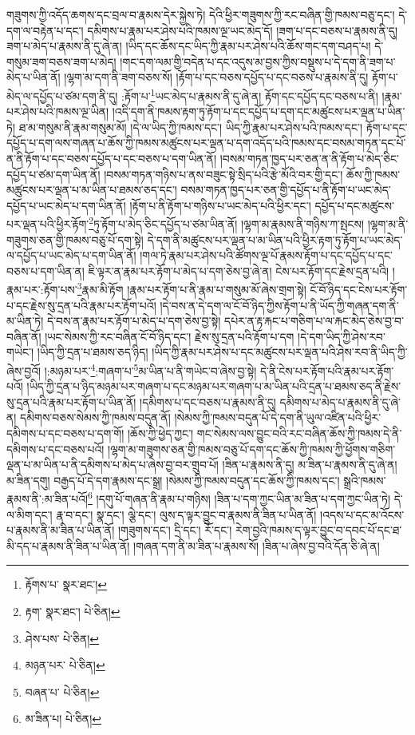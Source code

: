 གཟུགས་ཀྱི་འདོད་ཆགས་དང་བྲལ་བ་རྣམས་དེར་སྐྱེས་ཏེ། དེའི་ཕྱིར་གཟུགས་ཀྱི་རང་བཞིན་གྱི་ཁམས་བཅུ་དང་། དེ་དག་ལ་བརྟེན་པ་དང་། དམིགས་པ་རྣམ་པར་ཤེས་པའི་ཁམས་ལྔ་ཡང་མེད་དོ། །ཟག་པ་དང་བཅས་པ་རྣམས་ནི་དུ། ཟག་པ་མེད་པ་རྣམས་ནི་དུ་ཞེ་ན། །ཡིད་དང་ཆོས་དང་ཡིད་ཀྱི་རྣམ་པར་ཤེས་པའི་ཆོས་གང་དག་བཤད་པ། དེ་གསུམ་ཟག་བཅས་ཟག་པ་མེད། །གང་དག་ལམ་གྱི་བདེན་པ་དང་འདུས་མ་བྱས་ཀྱིས་བསྡུས་པ་དེ་དག་ནི་ཟག་པ་མེད་པ་ཡིན་ནོ། །ལྷག་མ་དག་ནི་ཟག་བཅས་སོ། །རྟོག་པ་དང་བཅས་དཔྱོད་པ་དང་བཅས་པ་རྣམས་ནི་དུ། རྟོག་པ་མེད་ལ་དཔྱོད་པ་ཙམ་དག་ནི་དུ། :རྟོག་པ་\footnote{རྟོགས་པ་  སྣར་ཐང་། }ཡང་མེད་པ་རྣམས་ནི་དུ་ཞེ་ན། རྟོག་དང་དཔྱོད་དང་བཅས་པ་ནི། །རྣམ་པར་ཤེས་པའི་ཁམས་ལྔ་ཡིན། །འདི་དག་ནི་ཁམས་རྟག་ཏུ་རྟོག་པ་དང་དཔྱོད་པ་དག་དང་མཚུངས་པར་ལྡན་པ་ཡིན་ཏེ། ཐ་མ་གསུམ་ནི་རྣམ་གསུམ་མོ། །དེ་ལ་ཡིད་ཀྱི་ཁམས་དང་། ཡིད་ཀྱི་རྣམ་པར་ཤེས་པའི་ཁམས་དང་། རྟོག་པ་དང་དཔྱོད་པ་དག་ལས་གཞན་པ་ཆོས་ཀྱི་ཁམས་མཚུངས་པར་ལྡན་པ་དག་འདོད་པའི་ཁམས་དང་བསམ་གཏན་དང་པོ་ན་ནི་རྟོག་པ་དང་བཅས་དཔྱོད་པ་དང་བཅས་པ་དག་ཡིན་ནོ། །བསམ་གཏན་ཁྱད་པར་ཅན་ན་ནི་རྟོག་པ་མེད་ཅིང་དཔྱོད་པ་ཙམ་དག་ཡིན་ནོ། །བསམ་གཏན་གཉིས་པ་ནས་བཟུང་སྟེ་སྲིད་པའི་རྩེ་མོའི་བར་གྱི་དང་། ཆོས་ཀྱི་ཁམས་མཚུངས་པར་ལྡན་པ་མ་ཡིན་པ་ཐམས་ཅད་དང་། བསམ་གཏན་ཁྱད་པར་ཅན་གྱི་དཔྱོད་པ་ནི་རྟོག་པ་ཡང་མེད་དཔྱོད་པ་ཡང་མེད་པ་དག་ཡིན་ནོ། །རྟོག་པ་ནི་རྟོག་པ་གཉིས་པ་ཡང་མེད་པའི་ཕྱིར་དང་། དཔྱོད་པ་དང་མཚུངས་པར་ལྡན་པའི་ཕྱིར་རྟོག་\footnote{རྟག་  སྣར་ཐང་།  པེ་ཅིན། }ཏུ་རྟོག་པ་མེད་ཅིང་དཔྱོད་པ་ཙམ་ཡིན་ནོ། །ལྷག་མ་རྣམས་ནི་གཉིས་ཀ་སྤངས། །ལྷག་མ་ནི་གཟུགས་ཅན་གྱི་ཁམས་བཅུ་པོ་དག་སྟེ། དེ་དག་ནི་མཚུངས་པར་ལྡན་པ་མ་ཡིན་པའི་ཕྱིར་རྟག་ཏུ་རྟོག་པ་ཡང་མེད་ལ་དཔྱོད་པ་ཡང་མེད་པ་དག་ཡིན་ནོ། །གལ་ཏེ་རྣམ་པར་ཤེས་པའི་ཚོགས་ལྔ་པོ་རྣམས་རྟོག་པ་དང་དཔྱོད་པ་དང་བཅས་པ་དག་ཡིན་ན། ཇི་ལྟར་ན་རྣམ་པར་རྟོག་པ་མེད་པ་དག་ཅེས་བྱ་ཞེ་ན། ངེས་པར་རྟོག་དང་རྗེས་དྲན་པའི། །རྣམ་པར་:རྟོག་པས་\footnote{ཤེས་པས་  པེ་ཅིན། }རྣམ་མི་རྟོག །རྣམ་པར་རྟོག་པ་ནི་རྣམ་པ་གསུམ་མོ་ཞེས་གྲག་སྟེ། ངོ་བོ་ཉིད་དང་ངེས་པར་རྟོག་པ་དང་རྗེས་སུ་དྲན་པའི་རྣམ་པར་རྟོག་པའོ། །དེ་བས་ན་དེ་དག་ལ་ངོ་བོ་ཉིད་ཀྱིས་རྟོག་པ་ནི་ཡོད་ཀྱི་གཞན་དག་ནི་མ་ཡིན་ཏེ། དེ་བས་ན་རྣམ་པར་རྟོག་པ་མེད་པ་དག་ཅེས་བྱ་སྟེ། དཔེར་ན་རྟ་རྐང་པ་གཅིག་པ་ལ་རྐང་མེད་ཅེས་བྱ་བ་བཞིན་ནོ། །ཡང་སེམས་ཀྱི་རང་བཞིན་ངོ་བོ་ཉིད་དང་། རྗེས་སུ་དྲན་པའི་རྟོག་པ་དག །དེ་དག་ཡིད་ཀྱི་ཤེས་རབ་གཡེང་། །ཡིད་ཀྱི་དྲན་པ་ཐམས་ཅད་ཉིད། །ཡིད་ཀྱི་རྣམ་པར་ཤེས་པ་དང་མཚུངས་པར་ལྡན་པའི་ཤེས་རབ་ནི་ཡིད་ཀྱི་ཞེས་བྱའོ། །:མཉམ་པར་\footnote{མཉན་པར་  པེ་ཅིན། }:གཞག་པ་\footnote{བཞན་པ་  པེ་ཅིན། }མ་ཡིན་པ་ནི་གཡེང་བ་ཞེས་བྱ་སྟེ། དེ་ནི་ངེས་པར་རྟོག་པའི་རྣམ་པར་རྟོག་པའོ། །ཡིད་ཀྱི་དྲན་པ་ཉིད་མཉམ་པར་གཞག་པ་དང་མཉམ་པར་གཞག་པ་མ་ཡིན་པའི་དྲན་པ་ཐམས་ཅད་ནི་རྗེས་སུ་དྲན་པའི་རྣམ་པར་རྟོག་པ་ཡིན་ནོ། །དམིགས་པ་དང་བཅས་པ་རྣམས་ནི་དུ། དམིགས་པ་མེད་པ་རྣམས་ནི་དུ་ཞེ་ན། དམིགས་བཅས་སེམས་ཀྱི་ཁམས་བདུན་ནོ། །སེམས་ཀྱི་ཁམས་བདུན་པོ་དེ་དག་ནི་ཡུལ་འཛིན་པའི་ཕྱིར་དམིགས་པ་དང་བཅས་པ་དག་གོ། །ཆོས་ཀྱི་ཕྱེད་ཀྱང་། གང་སེམས་ལས་བྱུང་བའི་རང་བཞིན་ཆོས་ཀྱི་ཁམས་དེ་ནི་དམིགས་པ་དང་བཅས་པའོ། །ལྷག་མ་གཟུགས་ཅན་གྱི་ཁམས་བཅུ་པོ་དག་དང་ཆོས་ཀྱི་ཁམས་ཀྱི་ཕྱོགས་གཅིག་ལྡན་པ་མ་ཡིན་པ་ནི་དམིགས་པ་མེད་པ་ཞེས་བྱ་བར་གྲུབ་པོ། །ཟིན་པ་རྣམས་ནི་དུ། མ་ཟིན་པ་རྣམས་ནི་དུ་ཞེ་ན། མ་ཟིན་དགུ། བརྒྱད་པོ་དེ་དག་རྣམས་དང་སྒྲ། །སེམས་ཀྱི་ཁམས་བདུན་དང་ཆོས་ཀྱི་ཁམས་དང་། སྒྲའི་ཁམས་རྣམས་ནི་:མ་ཟིན་པའོ།\footnote{མ་ཟིན་པ།  པེ་ཅིན། } །དགུ་པོ་གཞན་ནི་རྣམ་པ་གཉིས། །ཟིན་པ་དག་ཀྱང་ཡིན་མ་ཟིན་པ་དག་ཀྱང་ཡིན་ཏེ། དེ་ལ་མིག་དང་། རྣ་བ་དང་། སྣ་དང་། ལྕེ་དང་། ལུས་ད་ལྟར་བྱུང་བ་རྣམས་ནི་ཟིན་པ་ཡིན་ནོ། །འདས་པ་དང་མ་འོངས་པ་རྣམས་ནི་མ་ཟིན་པ་ཡིན་ནོ། །གཟུགས་དང་། དྲི་དང་། རོ་དང་། རེག་བྱའི་ཁམས་ད་ལྟར་བྱུང་བ་དབང་པོ་དང་ཐ་མི་དད་པ་རྣམས་ནི་ཟིན་པ་ཡིན་ནོ། །གཞན་དག་ནི་མ་ཟིན་པ་རྣམས་སོ། །ཟིན་པ་ཞེས་བྱ་བའི་དོན་ཅི་ཞེ་ན། 